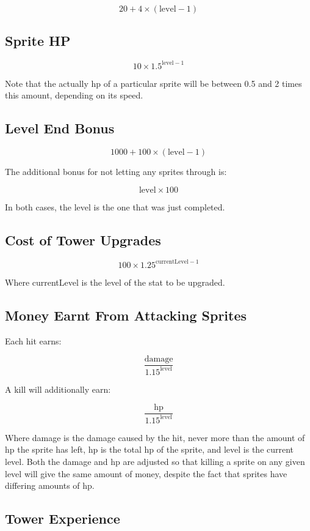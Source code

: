 \documentclass[a4paper,11pt]{article}
\begin{document}
\[20 + 4 \times \left( \mathrm{level} - 1 \right)\]

\subsection{Sprite HP}

\[10 \times 1.5^{\mathrm{level} - 1}\]

Note that the actually hp of a particular sprite will be between 0.5 and 2 times this amount, depending on its speed.

\subsection{Level End Bonus}

\[1000 + 100 \times \left( \mathrm{level} - 1 \right)\]

The additional bonus for not letting any sprites through is:

\[\mathrm{level} \times 100\]

In both cases, the level is the one that was just completed.

\subsection{Cost of Tower Upgrades}

\[100 \times 1.25^{\mathrm{currentLevel} - 1}\]

Where currentLevel is the level of the stat to be upgraded.

\subsection{Money Earnt From Attacking Sprites}

Each hit earns:

\[\frac{\mathrm{damage}}{1.15^{\mathrm{level}}}\]

A kill will additionally earn:

\[\frac{\mathrm{hp}}{1.15^{\mathrm{level}}}\]

Where damage is the damage caused by the hit, never more than the amount of hp the sprite has left, hp is the total hp of the sprite, and level is the current level. Both the damage and hp are adjusted so that killing a sprite on any given level will give the same amount of money, despite the fact that sprites have differing amounts of hp.

\subsection{Tower Experience}
\end{document}
